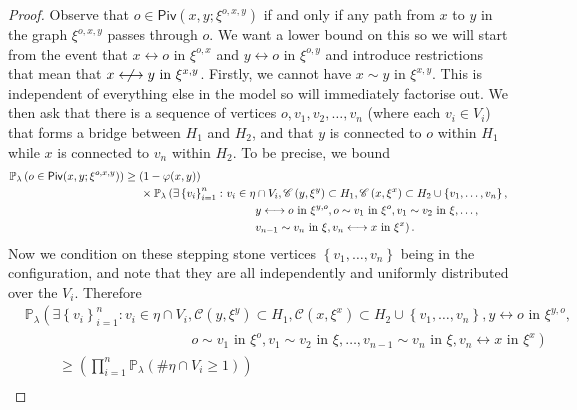 \documentclass[10pt,a4paper,dvipsnames]{article}
\theoremstyle{definition}
\theoremstyle{remark}
\newcommand{\pla}{\mathbb P_\lambda}
\newcommand{\C}{\mathscr {C}}
\newcommand{\piv}[1]{\mathsf {Piv}(#1)}
\newcommand{\conn}[3]{#1 \longleftrightarrow #2\textrm { in } #3}
\newcommand{\adja}[3]{#1 \sim #2\textrm { in } #3}
\newcommand{\nconn}[3]{#1 \centernot\longleftrightarrow #2\textrm { in } #3}
\newcommand{\orig}{o}
\newcommand{\connf}{\varphi}
\numberwithin{equation}{section}
\begin{document}
\begin{proof}
    Observe that $\orig\in \piv{x,y;\xi^{\orig,x,y}}$ if and only if any path from $x$ to $y$ in the graph $\xi^{\orig,x,y}$ passes through $\orig$. We want a lower bound on this so we will start from the event that $\conn{x}{\orig}{\xi^{\orig,x}}$ and $\conn{y}{\orig}{\xi^{\orig,y}}$ and introduce restrictions that mean that $\nconn{x}{y}{\xi^{x,y}}$. Firstly, we cannot have $\adja{x}{y}{\xi^{x,y}}$. This is independent of everything else in the model so will immediately factorise out. We then ask that there is a sequence of vertices $\orig,v_1,v_2,\ldots,v_n$ (where each $v_i\in V_i$) that forms a bridge between $H_1$ and $ H_2$, and that $y$ is connected to $\orig$ within $H_1$ while $x$ is connected to $v_n$ within $ H_2$. To be precise, we bound
    \begin{align}
        \pla\left(\orig\in \piv{x,y;\xi^{\orig,x,y}}\right) &\geq (1-\connf(x,y))\nonumber\\
        &\hspace{0.5cm}\times\pla\left( \exists \left\{v_i\right\}^n_{i=1}\colon v_i\in \eta\cap V_i,\C\left(y,\xi^{y}\right)\subset H_1,\C\left(x,\xi^{x}\right)\subset  H_2\cup\left\{v_1,\ldots,v_n\right\},\right.\nonumber\\
        &\hspace{4cm}\left.\conn{y}{\orig}{\xi^{y,\orig}},\adja{\orig}{v_1}{\xi^{\orig}},\adja{v_1}{v_2}{\xi},\ldots,\right. \nonumber\\
        &\hspace{4cm}\left.\adja{v_{n-1}}{v_n}{\xi},\conn{v_n}{x}{\xi^x}\right).
    \end{align}
    Now we condition on these stepping stone vertices $\left\{v_1,\ldots,v_n\right\}$ being in the configuration, and note that they are all independently and uniformly distributed over the $V_i$. Therefore
    \begin{align}
        &\pla\left( \exists \left\{v_i\right\}^n_{i=1}\colon v_i\in \eta\cap V_i,\C\left(y,\xi^{y}\right)\subset H_1,\C\left(x,\xi^{x}\right)\subset  H_2\cup\left\{v_1,\ldots,v_n\right\},\conn{y}{\orig}{\xi^{y,\orig}},\right.\nonumber\\
        &\hspace{5cm}\left.\adja{\orig}{v_1}{\xi^{\orig}},\adja{v_1}{v_2}{\xi},\ldots,\adja{v_{n-1}}{v_n}{\xi},\conn{v_n}{x}{\xi^x}\right)\nonumber\\
        &\hspace{1cm} \geq \left(\prod^n_{i=1}\pla\left(\#\eta\cap V_i \geq 1\right)\right)\nonumber\\

\end{align}
\end{proof}
\end{document}
